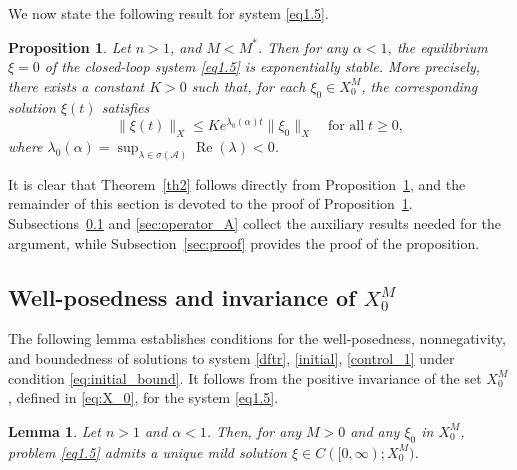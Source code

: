 \documentclass{mpi2015-cscpreprint}
\newtheorem{lemma}[theorem]{Lemma}
\newtheorem{proposition}{Proposition}
\numberwithin{equation}{section}
\begin{document}
We now state the following result for system \eqref{eq1.5}.

\begin{proposition}\label{prop1}
Let $n>1$, and $M<M^*$. Then for any $\alpha<1$, the  equilibrium $\xi= 0$ of the closed-loop system \eqref{eq1.5} is exponentially stable. More precisely, there exists a constant $K>0$ such that, for each $\xi_0\in X_0^M$, the corresponding solution $\xi(t)$ satisfies
\begin{equation}\label{eq3.8}
\|\xi(t)\|_X\leqslant K e^{\lambda_0(\alpha)t}\|\xi_0\|_X \quad\text{for all}\;t\geqslant0,
\end{equation}
where $\lambda_0(\alpha)=\sup_{\lambda\in\sigma(\mathcal{A})} \operatorname{Re}(\lambda)<0$.
\end{proposition}

It is clear that Theorem~\ref{th2} follows directly from Proposition~\ref{prop1}, and the remainder of this section is devoted to the proof of Proposition~\ref{prop1}. Subsections~\ref{sec:auxiliary} and \ref{sec:operator_A} collect the auxiliary results needed for the argument, while Subsection~\ref{sec:proof} provides the proof of the proposition.


\subsection{Well-posedness and invariance of $X_0^M$}\label{sec:auxiliary}

The following lemma establishes conditions for the well-posedness, nonnegativity, and boundedness of solutions to system \eqref{dftr}, \eqref{initial}, \eqref{control_1} under condition \eqref{eq:initial_bound}. It follows from the positive invariance of the set $X_0^M$, defined in \eqref{eq:X_0}, for the system \eqref{eq1.5}.


\begin{lemma}\label{lem:invariance}
Let $n>1$ and $\alpha<1$.  Then, for any $M>0$ and any $\xi_0$ in $X_0^M$, problem \eqref{eq1.5} admits a unique mild solution $\xi\in C([0,\infty);X_0^M)$.
\end{lemma}
\end{document}
